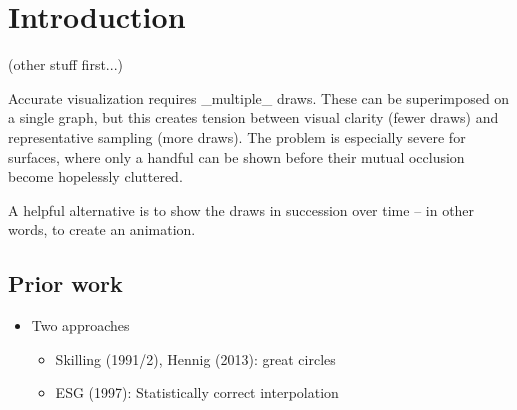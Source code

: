 \section{Introduction}
\label{sec:introduction}

(other stuff first...)

Accurate visualization requires _multiple_ draws.
These can be superimposed on a single graph, but this creates tension between
visual clarity (fewer draws) and representative sampling (more draws).
The problem is especially severe for surfaces, where only a handful can be
shown before their mutual occlusion become hopelessly cluttered.

A helpful alternative is to show the draws in succession over time -- in other
words, to create an animation.

\subsection{Prior work}
\label{sub:prior_work}

\begin{itemize}
  \item Two approaches
  \begin{itemize}
    \item Skilling (1991/2), Hennig (2013): great circles
    \item ESG (1997): Statistically correct interpolation
  \end{itemize}
\end{itemize}
